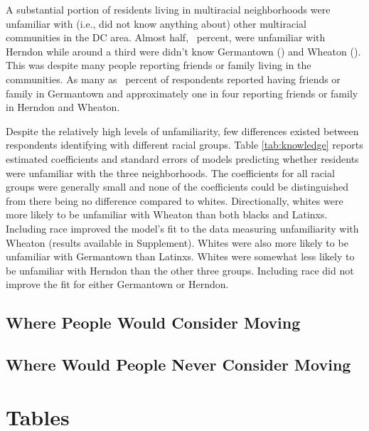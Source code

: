 \documentclass{baderart}
\begin{document}
A substantial portion of residents living in multiracial neighborhoods were unfamiliar with (i.e., did not know anything about) other multiracial communities in the DC area. Almost half, \dkherndon~percent, were unfamiliar with Herndon while around a third were didn't know Germantown (\dkgermantown) and Wheaton (\dkwheaton). This was despite many people reporting friends or family living in the communities. As many as \ffgermantown~percent of respondents reported having friends or family in Germantown and approximately one in four reporting friends or family in Herndon and Wheaton.

Despite the relatively high levels of unfamiliarity, few differences existed between respondents identifying with different racial groups. Table \ref{tab:knowledge} reports estimated coefficients and standard errors of models predicting whether residents were unfamiliar with the three neighborhoods. The coefficients for all racial groups were generally small and none of the coefficients could be distinguished from there being no difference compared to whites. Directionally, whites were more likely to be unfamiliar with Wheaton than both blacks and Latinxs. Including race improved the model's fit to the data measuring unfamiliarity with Wheaton (results available in Supplement). Whites were also more likely to be unfamiliar with Germantown than Latinxs. Whites were somewhat less likely to be unfamiliar with Herndon than the other three groups. Including race did not improve the fit for either Germantown or Herndon. 





\subsection{Where People Would Consider Moving}\label{where-people-would-consider-moving}

\subsection{Where Would People Never Consider Moving}\label{where-would-people-never-consider-moving}


\section{Tables}


\end{document}
